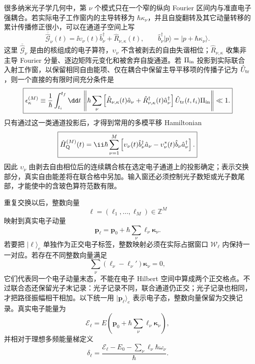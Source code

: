 很多纳米光子学几何中，第 $\nu$ 个模式只在一个窄的纵向 Fourier 区间内与准直电子强耦合。若实际电子工作窗内的主导转移为 $\hbar\kappa_\nu$，并且自旋翻转及其它动量转移的累计传播修正很小，可以在通道子空间上写
\[
\overline{\hat{\mathcal G}}_\nu(t)
=
\ii\upsilon_\nu(t)\hat b_\nu^\dagger
+\hat R_{\nu,\kappa}(t),
\qquad
\hat b_\nu^\dagger|p\rangle
=
|p+\hbar\kappa_\nu\rangle .
\]
这里 $\overline{\hat{\mathcal G}}_\nu$ 是由的核组成的电子算符，$\upsilon_\nu$ 不含被剥去的自由失谐相位；$\hat R_{\nu,\kappa}$ 收集非主导 Fourier 分量、逐边矩阵元变化和被舍弃自旋通道。若 $\Pi_{\rm in}$ 投影到实际联合入射工作窗，以保留相同自由能项、仅在耦合中保留主导平移项的传播子记为 $\hat U_{\rm tr}$，则一个直接的有限时间充分条件是
\begin{equation}
\boxed{
\epsilon_{\kappa}^{(M)}
\equiv
\frac1\hbar
\int_{t_i}^{t_f}\dd t\,
\left\|
\hbar\sum_\nu
\left[
\hat R_{\nu,\kappa}(t)\hat a_\nu
+\hat R_{\nu,\kappa}^\dagger(t)\hat a_\nu^\dagger
\right]
\hat U_{\rm tr}(t,t_i)\Pi_{\rm in}
\right\|
\ll1 .}
\label{eq:multimode_momentum_step_projection_error_dp101}
\end{equation}
只有通过这一类通道投影后，才得到常用的多模平移 Hamiltonian
\begin{equation}
\boxed{
 \hat H_{\rm Q}^{(M)}(t)
 =\ii\hbar\sum_{\nu=1}^{M}
 \left[
 \upsilon_\nu(t)\hat b_\nu^\dagger\hat a_\nu
 -\upsilon_\nu^*(t)\hat b_\nu\hat a_\nu^\dagger
 \right].}
\label{eq:multimode_qpinem_hamiltonian_dp47}
\end{equation}
因此 $\upsilon_\nu$ 由剥去自由相位后的连续耦合核在选定电子通道上的投影确定；表示交换部分，真实自由能差将在联合格中另加。输入窗还必须控制光子数矩或光子数尾部，才能使中的含玻色算符范数有限。

重复交换以后，整数向量
\[
\boldsymbol\ell=(\ell_1,\ldots,\ell_M)\in\mathbb Z^M
\]
映射到真实电子动量
\begin{equation*}
\mathbf p_{\boldsymbol\ell}
=
\mathbf p_0
+\hbar\sum_\nu\ell_\nu\boldsymbol\kappa_\nu .
\end{equation*}
若要把 $|\boldsymbol\ell\rangle_e$ 单独作为正交电子标签，整数映射必须在实际占据窗口 $\mathcal W_\ell$ 内保持一一对应。若存在不同整数向量满足
\[
\sum_\nu
(\ell_\nu-\ell_\nu')\boldsymbol\kappa_\nu=0,
\]
它们代表同一个电子动量末态，不能在电子 Hilbert 空间中算成两个正交格点。不过联合态还保留光子末记录：光子记录不同，联合通道仍正交；光子记录也相同，才把路径振幅相干相加。以下统一用 $|\mathbf p_{\boldsymbol\ell}\rangle_e$ 表示电子态，整数向量保留为交换记录。真实电子能量为
\begin{equation}
 \mathcal E_{\boldsymbol\ell}
 =E\!\left(
 \mathbf p_0+\hbar\sum_\nu
 \ell_\nu\boldsymbol\kappa_\nu
 \right),
\end{equation}
并相对于理想多频能量梯定义
\begin{equation}
\boxed{
 \delta_{\boldsymbol\ell}
 =
 \frac{
 \mathcal E_{\boldsymbol\ell}-E_0
 -\sum_\nu\ell_\nu\hbar\omega_\nu
 }{\hbar}.}
\label{eq:multimode_recoil_detuning_dp47}
\end{equation}

